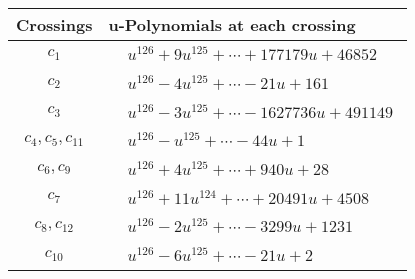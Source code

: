 \documentclass[1p]{elsarticle_modified}
\theoremstyle{definition}
\begin{document}
\begin{tabular}{m{50pt}|m{274pt}}
Crossings & \hspace{64pt}u-Polynomials at each crossing \\
\hline $$\begin{aligned}c_{1}\end{aligned}$$&$\begin{aligned}
&u^{126}+9 u^{125}+\cdots+177179 u+46852
\end{aligned}$\\
\hline $$\begin{aligned}c_{2}\end{aligned}$$&$\begin{aligned}
&u^{126}-4 u^{125}+\cdots-21 u+161
\end{aligned}$\\
\hline $$\begin{aligned}c_{3}\end{aligned}$$&$\begin{aligned}
&u^{126}-3 u^{125}+\cdots-1627736 u+491149
\end{aligned}$\\
\hline $$\begin{aligned}c_{4},c_{5},c_{11}\end{aligned}$$&$\begin{aligned}
&u^{126}- u^{125}+\cdots-44 u+1
\end{aligned}$\\
\hline $$\begin{aligned}c_{6},c_{9}\end{aligned}$$&$\begin{aligned}
&u^{126}+4 u^{125}+\cdots+940 u+28
\end{aligned}$\\
\hline $$\begin{aligned}c_{7}\end{aligned}$$&$\begin{aligned}
&u^{126}+11 u^{124}+\cdots+20491 u+4508
\end{aligned}$\\
\hline $$\begin{aligned}c_{8},c_{12}\end{aligned}$$&$\begin{aligned}
&u^{126}-2 u^{125}+\cdots-3299 u+1231
\end{aligned}$\\
\hline $$\begin{aligned}c_{10}\end{aligned}$$&$\begin{aligned}
&u^{126}-6 u^{125}+\cdots-21 u+2
\end{aligned}$\\
\hline
\end{tabular}\\~\\
\end{document}

